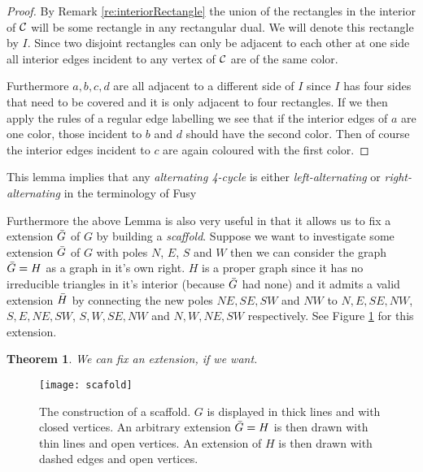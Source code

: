\documentclass[a4paper]{article}
\newtheorem{thrm}{Theorem}
\theoremstyle{definition}
\newcommand{\Fusy}{Fusy}
\begin{document}
\begin{proof}
By Remark \ref{re:interiorRectangle} the union of the rectangles in the interior of $\mathcal{C}$ will be some rectangle in any rectangular dual. We will denote this rectangle by $I$. Since two disjoint rectangles can only be adjacent to each other at one side all interior edges incident to any vertex of $\mathcal{C}$ are of the same color. 

Furthermore $a, b, c, d$ are all adjacent to a different side of $I$ since $I$ has four sides that need to be covered and it is only adjacent to four rectangles. If we then apply the rules of a regular edge labelling we see that if the interior edges of $a$ are one color, those incident to $b$ and $d$ should have the second color. Then of course the interior edges incident to $c$ are again coloured with the first color. 

\end{proof}

This lemma implies that any \emph{alternating 4-cycle} %
is either \emph{left-alternating} or \emph{right-alternating} %
in the terminology of \Fusy

Furthermore the above Lemma is also very useful in that it allows us to fix a extension $\bar{G}$ of $G$ by building a \emph{scaffold}. Suppose we want to investigate some extension $\bar{G}$ of $G$ with poles $N$, $E$, $S$ and $W$ then we can consider the graph $\bar{G} = H$ as a graph in it's own right. $H$ is a proper graph since it has no irreducible triangles in it's interior (because $\bar{G}$ had none) and it admits a valid extension $\bar{H}$ by connecting the new poles $NE, SE, SW$ and $NW$ to $N, E, SE, NW$, $S, E, NE, SW$, $S, W, SE, NW$ and $N, W, NE, SW$ respectively. See Figure \ref{fig:scafold} for this extension.  

\begin{thrm}
\label{th:fixExtension}
We can fix an extension, if we want.
\end{thrm}

\begin{figure}[h!]
\centering
\texttt{[image: scafold]}

\caption{The construction of a scaffold. $G$ is displayed in thick lines and with closed vertices. An arbitrary extension $\bar{G} =H$ is then drawn with thin lines and open vertices. An extension of $H$ is then drawn with dashed edges and open vertices. 
    \label{fig:scafold}}
\end{figure}
\end{document}
